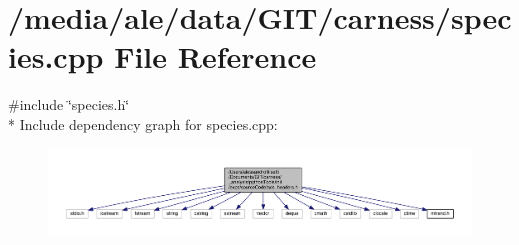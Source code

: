 \hypertarget{a00086}{\section{/media/ale/data/\-G\-I\-T/carness/species.cpp File Reference}
\label{a00086}
}
{\ttfamily \#include \char`\"{}species.\-h\char`\"{}}\\*
Include dependency graph for species.\-cpp\-:\nopagebreak
\begin{figure}[H]
\begin{center}
\leavevmode
\includegraphics[width=350pt]{a00160}
\end{center}
\end{figure}
